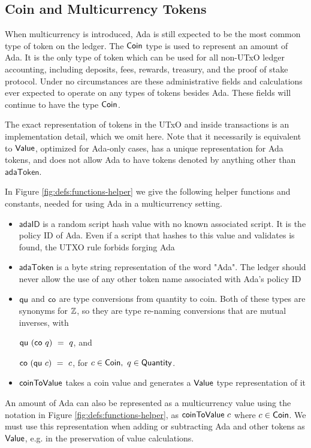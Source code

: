\subsection*{Coin and Multicurrency Tokens}
When multicurrency is introduced, Ada is still expected to be
the most common type of token on the ledger.
The $\mathsf{Coin}$ type is used to represent an amount of Ada.
It is the only
type of token which can be used for all non-UTxO ledger accounting, including deposits,
fees, rewards, treasury, and the proof of stake protocol. Under no circumstances
are these administrative fields and calculations ever expected to operate on
any types of tokens besides Ada. These fields will continue to have the type $\mathsf{Coin}$.

The exact representation of tokens in the UTxO and inside transactions
is an implementation detail, which we omit here.
Note that it necessarily is equivalent to $\mathsf{Value}$, optimized
for Ada-only cases, has a unique representation for Ada tokens,
and does not allow Ada to have tokens denoted by anything other than $\mathsf{adaToken}$.

In Figure \ref{fig:defs:functions-helper} we give the following helper functions
and constants, needed for using Ada in a multicurrency setting.

\begin{itemize}
  \item $\mathsf{adaID}$ is a random script hash value with no known associated
  script. It is the policy ID of Ada. Even if a
  script that hashes to this value
  and validates is found, the UTXO rule forbids forging Ada
  \item $\mathsf{adaToken}$ is a byte string representation of the word "Ada".
  The ledger should never allow the use of any other token name associated
  with Ada's policy ID
  \item $\mathsf{qu}$ and $\mathsf{co}$ are type conversions from quantity to
  coin. Both of these types are synonyms for $\mathbb{Z}$, so they are
  type re-naming conversions that are mutual inverses, with

  $\mathsf{qu} ~(\mathsf{co} ~q )~= ~q$, and

  $\mathsf{co}~ (\mathsf{qu}~ c) ~=~ c$, for $c \in \mathsf{Coin},~q \in \mathsf{Quantity}$.

  \item $\mathsf{coinToValue}$ takes a coin value and generates a $\mathsf{Value}$ type representation
  of it
\end{itemize}

An amount of Ada can also be represented as a multicurrency value
using the notation in Figure \ref{fig:defs:functions-helper}, as
$\mathsf{coinToValue}~c$ where $c \in \mathsf{Coin}$. We must use this representation
when adding or subtracting Ada and other tokens as $\mathsf{Value}$, e.g. in the
preservation of value calculations.

